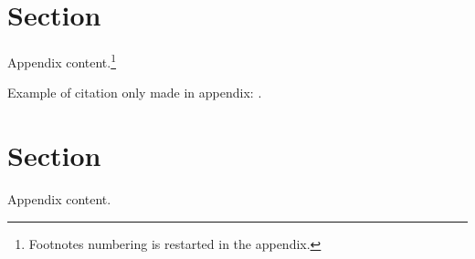 \newpage
\begin{appendices}

\titleformat{\section}{\Large\bfseries}{}{0pt}{\appendixname\enskip\thesection:\quad}	%

\setcounter{page}{1}										%
\setcounter{footnote}{0}									%
\renewcommand{\thetable}{\thesection.\arabic{table}}		%
\renewcommand{\thefigure}{\thesection.\arabic{figure}}		%
\renewcommand{\theequation}{\thesection.\arabic{equation}}	%

\begin{center}
	{\LARGE }
\end{center}


\section{Section} \label{sec:appdx1}
\vspace{0.7cm}
\iftoggle{toclinks}{\gototoc}{} 							%
\iftoggle{cboxes}{	   				  						%
	\begin{boxeditems}
		\item To-do list.
	\end{boxeditems}}{}
\setcounter{table}{0}
\setcounter{figure}{0}
\setcounter{equation}{0}

Appendix content.\footnote{Footnotes numbering is restarted in the appendix.}



Example of citation only made in appendix: \parencite{ChangLi:2017AER}.


\section{Section} \label{sec:appdx2}
\vspace{0.7cm}
\iftoggle{toclinks}{\gototoc}{} 							%
\iftoggle{cboxes}{	   				  						%
	\begin{boxeditems}
		\item To-do list.
	\end{boxeditems}}{}
\setcounter{table}{0}
\setcounter{figure}{0}
\setcounter{equation}{0}

Appendix content.








\titleformat{\section}{\normalfont\Large\bfseries}{\thesection}{1em}{}	%

\end{appendices}